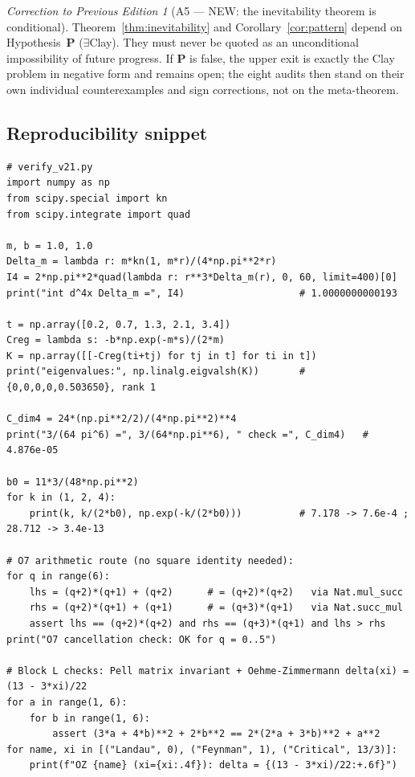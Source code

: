 \documentclass[11pt,a4paper]{article}
\theoremstyle{plain}
\theoremstyle{definition}
\theoremstyle{remark}
\newtheorem{correction}[theorem]{Correction to Previous Edition}
\renewcommand{\_}{\oldunderscore\allowbreak}
\begin{document}
\begin{correction}[A5 --- NEW: the inevitability theorem is conditional]\label{corr:conditional}
Theorem~\ref{thm:inevitability} and Corollary~\ref{cor:pattern} depend on
Hypothesis~\textbf{P} ($\exists$Clay). They must never be quoted as an unconditional impossibility
of future progress. If \textbf{P} is false, the upper exit is exactly the Clay problem in negative
form and remains open; the eight audits then stand on their own individual counterexamples and
sign corrections, not on the meta-theorem.
\end{correction}
\subsection*{Reproducibility snippet}
\begin{Verbatim}[fontsize=\scriptsize,frame=single,rulecolor=\color{darkgray}]
# verify_v21.py
import numpy as np
from scipy.special import kn
from scipy.integrate import quad

m, b = 1.0, 1.0
Delta_m = lambda r: m*kn(1, m*r)/(4*np.pi**2*r)
I4 = 2*np.pi**2*quad(lambda r: r**3*Delta_m(r), 0, 60, limit=400)[0]
print("int d^4x Delta_m =", I4)                    # 1.0000000000193

t = np.array([0.2, 0.7, 1.3, 2.1, 3.4])
Creg = lambda s: -b*np.exp(-m*s)/(2*m)
K = np.array([[-Creg(ti+tj) for tj in t] for ti in t])
print("eigenvalues:", np.linalg.eigvalsh(K))       # {0,0,0,0,0.503650}, rank 1

C_dim4 = 24*(np.pi**2/2)/(4*np.pi**2)**4
print("3/(64 pi^6) =", 3/(64*np.pi**6), " check =", C_dim4)   # 4.876e-05

b0 = 11*3/(48*np.pi**2)
for k in (1, 2, 4):
    print(k, k/(2*b0), np.exp(-k/(2*b0)))          # 7.178 -> 7.6e-4 ; 28.712 -> 3.4e-13

# O7 arithmetic route (no square identity needed):
for q in range(6):
    lhs = (q+2)*(q+1) + (q+2)      # = (q+2)*(q+2)   via Nat.mul_succ
    rhs = (q+2)*(q+1) + (q+1)      # = (q+3)*(q+1)   via Nat.succ_mul
    assert lhs == (q+2)*(q+2) and rhs == (q+3)*(q+1) and lhs > rhs
print("O7 cancellation check: OK for q = 0..5")

# Block L checks: Pell matrix invariant + Oehme-Zimmermann delta(xi) = (13 - 3*xi)/22
for a in range(1, 6):
    for b in range(1, 6):
        assert (3*a + 4*b)**2 + 2*b**2 == 2*(2*a + 3*b)**2 + a**2
for name, xi in [("Landau", 0), ("Feynman", 1), ("Critical", 13/3)]:
    print(f"OZ {name} (xi={xi:.4f}): delta = {(13 - 3*xi)/22:+.6f}")


\end{Verbatim}
\end{document}
